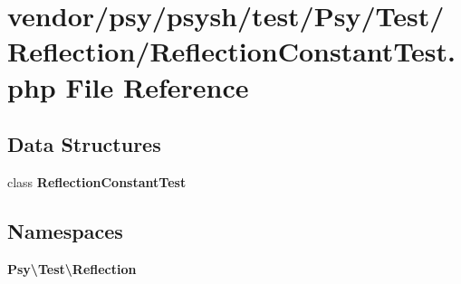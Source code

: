 \section{vendor/psy/psysh/test/\+Psy/\+Test/\+Reflection/\+Reflection\+Constant\+Test.php File Reference}
\label{_reflection_constant_test_8php}
\subsection*{Data Structures}
\begin{DoxyCompactItemize}
\item 
class {\bf Reflection\+Constant\+Test}
\end{DoxyCompactItemize}
\subsection*{Namespaces}
\begin{DoxyCompactItemize}
\item 
 {\bf Psy\textbackslash{}\+Test\textbackslash{}\+Reflection}
\end{DoxyCompactItemize}
